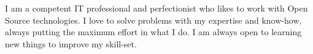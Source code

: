 I am a competent IT professional and perfectionist who likes to work with Open Source technologies.
I love to solve problems with my expertise and know-how, always putting the maximum effort in what I do.
I am always open to learning new things to improve my skill-set.
